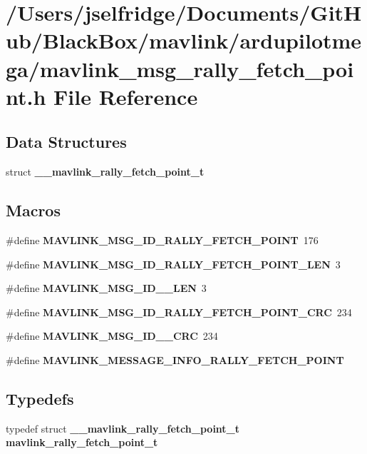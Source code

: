 \section{/\+Users/jselfridge/\+Documents/\+Git\+Hub/\+Black\+Box/mavlink/ardupilotmega/mavlink\+\_\+msg\+\_\+rally\+\_\+fetch\+\_\+point.h File Reference}
\label{mavlink__msg__rally__fetch__point_8h}
\subsection*{Data Structures}
\begin{DoxyCompactItemize}
\item 
struct \textbf{ \+\_\+\+\_\+mavlink\+\_\+rally\+\_\+fetch\+\_\+point\+\_\+t}
\end{DoxyCompactItemize}
\subsection*{Macros}
\begin{DoxyCompactItemize}
\item 
\#define \textbf{ M\+A\+V\+L\+I\+N\+K\+\_\+\+M\+S\+G\+\_\+\+I\+D\+\_\+\+R\+A\+L\+L\+Y\+\_\+\+F\+E\+T\+C\+H\+\_\+\+P\+O\+I\+NT}~176
\item 
\#define \textbf{ M\+A\+V\+L\+I\+N\+K\+\_\+\+M\+S\+G\+\_\+\+I\+D\+\_\+\+R\+A\+L\+L\+Y\+\_\+\+F\+E\+T\+C\+H\+\_\+\+P\+O\+I\+N\+T\+\_\+\+L\+EN}~3
\item 
\#define \textbf{ M\+A\+V\+L\+I\+N\+K\+\_\+\+M\+S\+G\+\_\+\+I\+D\+\_\+\_\+\+L\+EN}~3
\item 
\#define \textbf{ M\+A\+V\+L\+I\+N\+K\+\_\+\+M\+S\+G\+\_\+\+I\+D\+\_\+\+R\+A\+L\+L\+Y\+\_\+\+F\+E\+T\+C\+H\+\_\+\+P\+O\+I\+N\+T\+\_\+\+C\+RC}~234
\item 
\#define \textbf{ M\+A\+V\+L\+I\+N\+K\+\_\+\+M\+S\+G\+\_\+\+I\+D\+\_\+\_\+\+C\+RC}~234
\item 
\#define \textbf{ M\+A\+V\+L\+I\+N\+K\+\_\+\+M\+E\+S\+S\+A\+G\+E\+\_\+\+I\+N\+F\+O\+\_\+\+R\+A\+L\+L\+Y\+\_\+\+F\+E\+T\+C\+H\+\_\+\+P\+O\+I\+NT}
\end{DoxyCompactItemize}
\subsection*{Typedefs}
\begin{DoxyCompactItemize}
\item 
typedef struct \textbf{ \+\_\+\+\_\+mavlink\+\_\+rally\+\_\+fetch\+\_\+point\+\_\+t} \textbf{ mavlink\+\_\+rally\+\_\+fetch\+\_\+point\+\_\+t}
\end{DoxyCompactItemize}


